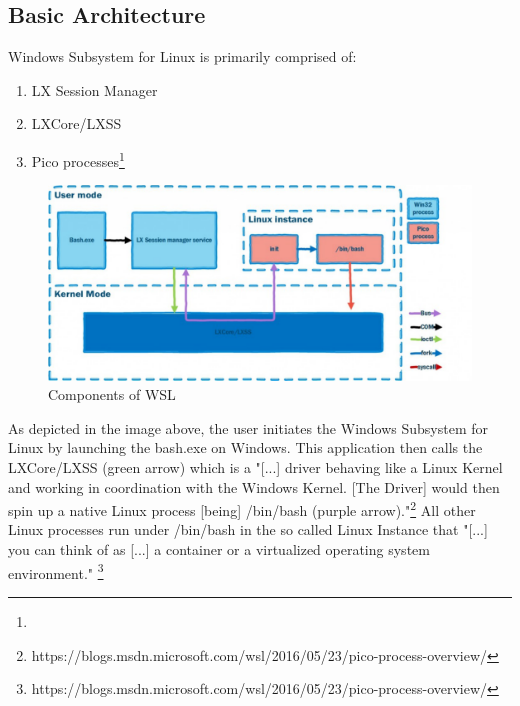 \documentclass[utf8,biblatex]{lni}
\begin{document}
\subsection{Basic Architecture}

Windows Subsystem for Linux is primarily comprised of: 
\begin{enumerate}
    \item LX Session Manager
    \item LXCore/LXSS
    \item Pico processes\footnote{}
\end{enumerate}

\begin{figure}
  \centering
  \includegraphics[width=1\textwidth]{WSL Architecture.pdf}
  \caption{Components of WSL}
  \label{img:architecture}
\end{figure}


As depicted in the image above, the user initiates the Windows Subsystem for Linux by launching the bash.exe on Windows. This application then calls the LXCore/LXSS (green arrow) which is a "[...] driver behaving like a Linux Kernel and working in coordination with the Windows Kernel. [The Driver] would then spin up a native Linux process [being] /bin/bash (purple arrow)."\footnote{https://blogs.msdn.microsoft.com/wsl/2016/05/23/pico-process-overview/} All other Linux processes run under /bin/bash in the so called Linux Instance that "[...] you can think of as [...] a container or a virtualized operating system environment." \footnote{https://blogs.msdn.microsoft.com/wsl/2016/05/23/pico-process-overview/}
\end{document}
